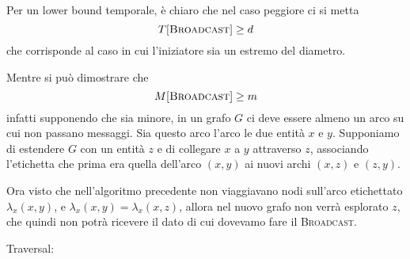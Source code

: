 \documentclass[12pt, answers]{exam}
\begin{document}
\begin{questions}
\begin{parts}
\begin{solution}
			Per un lower bound temporale, è chiaro che nel caso peggiore ci si metta
			$$ T[\textsc{Broadcast}] \geq d $$
			che corrisponde al caso in cui l'iniziatore sia un estremo del diametro.

			Mentre si può dimostrare che 
			$$ M[\textsc{Broadcast}] \geq m $$
			infatti supponendo che sia minore, in un grafo $G$ ci deve essere almeno un arco su cui non passano messaggi.
			Sia questo arco l'arco le due entità $x$ e $y$.
			Supponiamo di estendere $G$ con un entità $z$ e di collegare $x$ a $y$ attraverso $z$, associando l'etichetta che prima era quella dell'arco $(x, y)$ ai nuovi archi $(x, z)$ e $(z, y)$.
			
			Ora visto che nell'algoritmo precedente non viaggiavano nodi sull'arco etichettato $\lambda_x(x, y)$, e $\lambda_x(x, y) = \lambda_x(x, z)$, allora nel nuovo grafo non verrà esplorato $z$, che quindi non potrà ricevere il dato di cui dovevamo fare il \textsc{Broadcast}.
		\end{solution}
	\end{parts}
	\question Traversal:
\end{questions}
\end{document}
